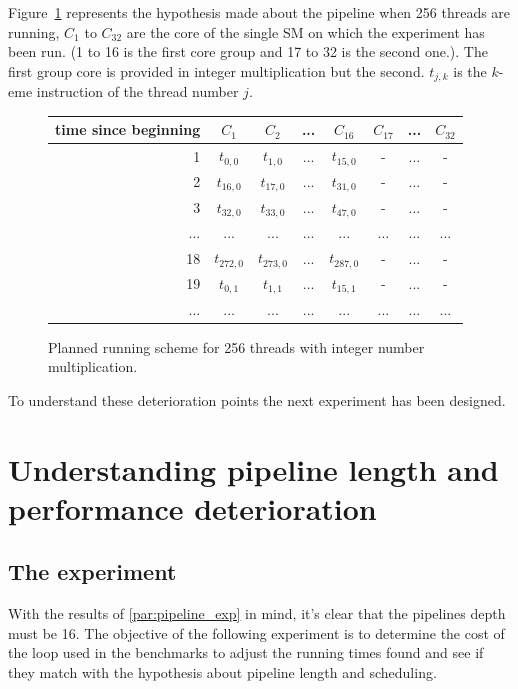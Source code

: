 \documentclass{report}
\begin{document}
    Figure~\ref{fig:int_prediction_256} represents the hypothesis made about the pipeline when 256
    threads are running, $C_1$ to $C_{32}$ are the core of the single SM on which the experiment
    has been run. (1 to 16 is the first core group and 17 to 32 is the second one.). The first
    group core is provided in integer multiplication but the second. $t_{j,k}$ is the $k$-eme instruction of the thread number
    $j$.
   \begin{figure}[H]
      \centering
       \begin{tabular}{ | r || c | c | c | c || c | c | c | }
    	    \hline
    	    time since beginning & $C_1$ & $C_2$ & ... & $C_{16}$ & $C_{17}$ & ... & $C_{32}$ \\ \hline  \hline
    	   1 & $t_{0,0}$ & $t_{1,0}$ & ... & $t_{15,0}$ & - & ... & - \\ \hline 
    	   2 & $t_{16,0}$ & $t_{17,0}$ & ... & $t_{31,0}$ & - & ... & - \\ \hline
    	   3 & $t_{32,0}$ & $t_{33,0}$ & ... & $t_{47,0}$ & - & ... & - \\ \hline
    	   ... & ... & ... & ... & ... & ... & ... & ... \\ \hline
    	   18 & $t_{272,0}$ & $t_{273,0}$ & ... & $t_{287,0}$ & - & ... & - \\ \hline
    	   19 & $t_{0,1}$ & $t_{1,1}$ & ... & $t_{15,1}$ & - & ... & - \\ \hline
    	   ... & ... & ... & ... & ... & ... & ... & ... \\ \hline
  	\end{tabular}
  	\captionsetup{justification=centering}
  	\caption{Planned running scheme for 256 threads with integer number multiplication.}
  	\label{fig:int_prediction_256}
   \end{figure}

    To understand these deterioration points the next experiment has been designed.

\section{Understanding pipeline length and performance deterioration}
    \subsection{The experiment}
    With the results of \ref{par:pipeline_exp} in mind, it's clear that the pipelines depth 
    must be 16. The objective of the following experiment is to determine the cost of
    the loop used in the benchmarks to adjust the running times found and see if they match with
    the hypothesis about pipeline length and scheduling. 
\end{document}
